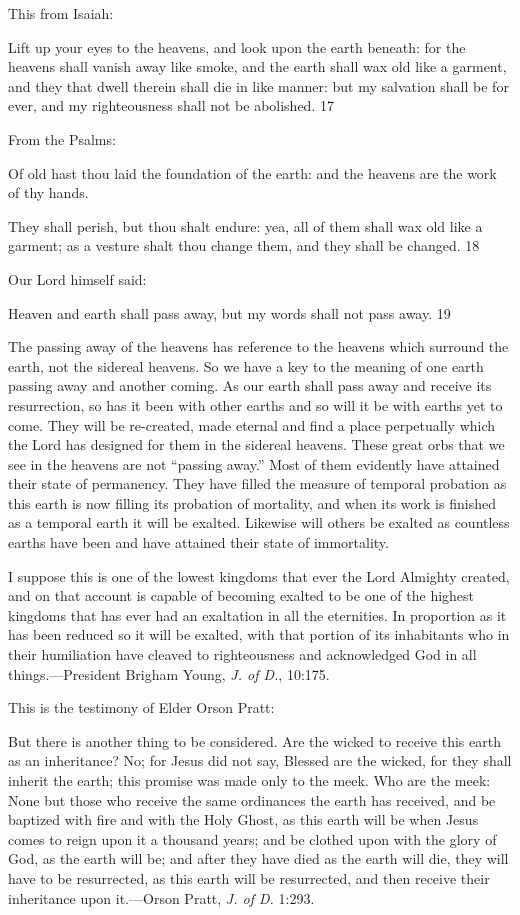 This from Isaiah:

Lift up your eyes to the heavens, and look upon the earth beneath: for the heavens shall
vanish away like smoke, and the earth shall wax old like a garment, and they that dwell
therein shall die in like manner: but my salvation shall be for ever, and my righteousness
shall not be abolished. 17

From the Psalms:

Of old hast thou laid the foundation of the earth: and the heavens are the work of thy hands.

They shall perish, but thou shalt endure: yea, all of them shall wax old like a garment; as a
vesture shalt thou change them, and they shall be changed. 18

Our Lord himself said:

Heaven and earth shall pass away, but my words shall not pass away. 19

The passing away of the heavens has reference to the heavens which surround the earth, not
the sidereal heavens. So we have a key to the meaning of one earth passing away and another
coming. As our earth shall pass away and receive its resurrection, so has it been with other
earths and so will it be with earths yet to come. They will be re-created, made eternal and
find a place perpetually which the Lord has designed for them in the sidereal heavens. These
great orbs that we see in the heavens are not ``passing away.'' Most of them evidently have
attained their state of permanency. They have filled the measure of temporal probation as this
earth is now filling its probation of mortality, and when its work is finished as a temporal
earth it will be exalted. Likewise will others be exalted as countless earths have been and
have attained their state of immortality.

I suppose this is one of the lowest kingdoms that ever the Lord Almighty created, and on that
account is capable of becoming exalted to be one of the highest kingdoms that has ever had
an exaltation in all the eternities. In proportion as it has been reduced so it will be exalted,
with that portion of its inhabitants who in their humiliation have cleaved to righteousness and
acknowledged God in all things.—President Brigham Young, \textit{J. of D.}, 10:175.

This is the testimony of Elder Orson Pratt:

But there is another thing to be considered. Are the wicked to receive this earth as an
inheritance? No; for Jesus did not say, Blessed are the wicked, for they shall inherit the earth;
this promise was made only to the meek. Who are the meek: None but those who receive the
same ordinances the earth has received, and be baptized with fire and with the Holy Ghost, as
this earth will be when Jesus comes to reign upon it a thousand years; and be clothed upon
with the glory of God, as the earth will be; and after they have died as the earth will die, they
will have to be resurrected, as this earth will be resurrected, and then receive their inheritance
upon it.—Orson Pratt, \textit{J. of D.} 1:293.

